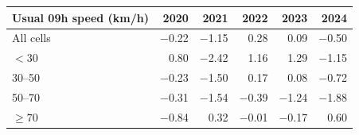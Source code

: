 \begin{tabular}{lrrrrr}
\toprule
Usual 09h speed (km/h) & 2020 & 2021 & 2022 & 2023 & 2024 \\
\midrule
All cells & \ensuremath{-}0.22 & \ensuremath{-}1.15 & 0.28 & 0.09 & \ensuremath{-}0.50 \\
\addlinespace
$<30$ & 0.80 & \ensuremath{-}2.42 & 1.16 & 1.29 & \ensuremath{-}1.15 \\
30--50 & \ensuremath{-}0.23 & \ensuremath{-}1.50 & 0.17 & 0.08 & \ensuremath{-}0.72 \\
50--70 & \ensuremath{-}0.31 & \ensuremath{-}1.54 & \ensuremath{-}0.39 & \ensuremath{-}1.24 & \ensuremath{-}1.88 \\
$\geq 70$ & \ensuremath{-}0.84 & 0.32 & \ensuremath{-}0.01 & \ensuremath{-}0.17 & 0.60 \\
\bottomrule
\end{tabular}

